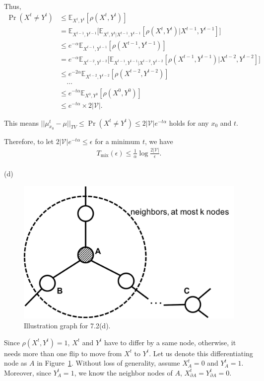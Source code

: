 \documentclass{article}
\newcommand{\qeds}{\hfill\qedsymbol}
\begin{document}
Thus,
\begin{align*}
	\Pr(X^t \neq Y^t) &\leq \mathbb{E}_{X^t, Y^t}[\rho(X^t, Y^t)] \\
	&= \mathbb{E}_{X^{t-1}, Y^{t-1}}
	\big[\mathbb{E}_{X^t, Y^t | X^{t-1}, Y^{t-1}}[\rho(X^t, Y^t) | X^{t-1}, Y^{t-1}]\big] \\
	&\leq e^{-\alpha}\mathbb{E}_{X^{t-1}, Y^{t-1}}[\rho(X^{t-1}, Y^{t-1})] \\
	&= e^{-\alpha}\mathbb{E}_{X^{t-2}, Y^{t-2}}\big[\mathbb{E}_{X^{t-1}, Y^{t-1} | X^{t-2}, Y^{t-2}}[\rho(X^{t-1}, Y^{t-1}) | X^{t-2}, Y^{t-2}]\big] \\
	&\leq e^{-2\alpha}\mathbb{E}_{X^{t-2}, Y^{t-2}}[\rho(X^{t-2}, Y^{t-2})] \\
	&\;\;\;\;\cdots \\
	&\leq e^{-t\alpha} \mathbb{E}_{X^0, Y^0}[\rho(X^0, Y^0)] \\
	&\leq e^{-t\alpha} \times 2|\mathscr{V}|.
\end{align*}

This means $||\mu_{x_0}^t - \mu ||_{TV} \leq \Pr(X^t \neq Y^t) \leq 2|\mathscr{V}|e^{-t\alpha}$ holds for any $x_0$ and $t$.

Therefore, to let $2|\mathscr{V}|e^{-t\alpha} \leq \epsilon$ for a minimum $t$, we have 
\begin{align*}
	T_{\text{mix}}(\epsilon) \leq \frac{1}{\alpha}\log\frac{2|\mathscr{V}|}{\epsilon}.
\end{align*} \qeds
\\

\noindent
(d)
\begin{figure}[h!]
  \centering
  \vspace{-0.3cm}
  \includegraphics[width=0.5\columnwidth]{72d.pdf}
    \vspace{-0.1cm}
  \caption{Illustration graph for 7.2(d).}
  \label{f:72d}
\end{figure}
%

\noindent
Since $\rho(X^t, Y^t) = 1$, $X^t$ and $Y^t$ have to differ by a same node, otherwise,
it needs more than one flip to move from $X^t$ to $Y^t$. Let us denote this differentiating node
as $A$ in Figure~\ref{f:72d}. Without loss of generality, assume $X^t_A = 0$ and $Y^t_A = 1$. Moreover, since $Y^t_A = 1$, we know the neighbor nodes of $A$,
$X^t_{\partial A} = Y^t_{\partial A} = 0$.
\end{document}
